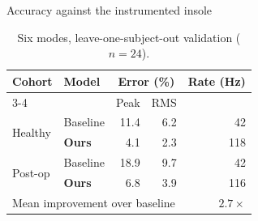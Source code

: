 \documentclass[aspectratio=43]{beamer}
\begin{document}
\begin{frame}{Accuracy against the instrumented insole}
  \begin{table}
    \centering
    \begin{tabular}{llrrr}
      \toprule
      \multirow{2}{*}{Cohort} & \multirow{2}{*}{Model} &
        \multicolumn{2}{c}{Error (\%)} & \multirow{2}{*}{Rate (Hz)} \\
      \cmidrule(lr){3-4}
       &  & Peak & RMS &  \\
      \midrule
      \multirow{2}{*}{Healthy}  & Baseline      & 11.4 & 6.2 & 42 \\
                                & \textbf{Ours} &  4.1 & 2.3 & 118 \\
      \midrule
      \multirow{2}{*}{Post-op}  & Baseline      & 18.9 & 9.7 & 42 \\
                                & \textbf{Ours} &  6.8 & 3.9 & 116 \\
      \midrule
      \multicolumn{4}{l}{Mean improvement over baseline} & $2.7\times$ \\
      \bottomrule
    \end{tabular}
    \caption{Six modes, leave-one-subject-out validation ($n = 24$).}
  \end{table}
\end{frame}
\end{document}
